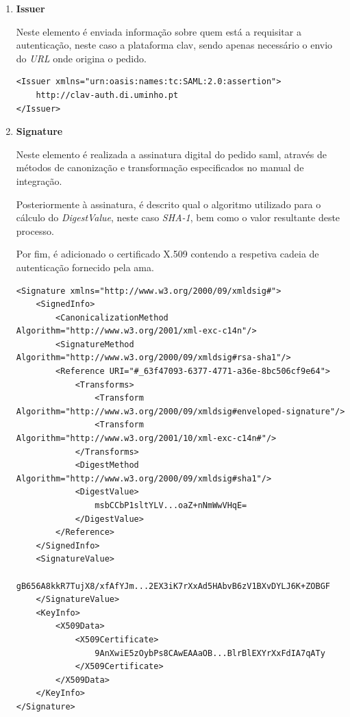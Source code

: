 \vspace{-2mm}
\begin{enumerate}
    \item \textbf{Issuer}
    
    Neste elemento é enviada informação sobre quem está a requisitar a autenticação, neste caso a plataforma \gls{clav}, sendo apenas necessário o envio do \emph{URL} onde origina o pedido\cite{manualAuthGov}.
    
    \begin{lstlisting}
<Issuer xmlns="urn:oasis:names:tc:SAML:2.0:assertion">
    http://clav-auth.di.uminho.pt
</Issuer>
    \end{lstlisting}
    
    \vspace{-14mm}
    \item \textbf{Signature}
    
    Neste elemento é realizada a assinatura digital do pedido \gls{saml}, através de métodos de canonização e transformação especificados no manual de integração\cite{manualAuthGov}.
    
    Posteriormente à assinatura, é descrito qual o algoritmo utilizado para o cálculo do \emph{DigestValue}, neste caso \emph{SHA-1}, bem como o valor resultante deste processo.
    
    Por fim, é adicionado o certificado X.509 contendo a respetiva cadeia de autenticação fornecido pela \gls{ama}.
    
    \begin{lstlisting}
<Signature xmlns="http://www.w3.org/2000/09/xmldsig#">
    <SignedInfo>
        <CanonicalizationMethod Algorithm="http://www.w3.org/2001/xml-exc-c14n"/>
        <SignatureMethod Algorithm="http://www.w3.org/2000/09/xmldsig#rsa-sha1"/>
        <Reference URI="#_63f47093-6377-4771-a36e-8bc506cf9e64">
            <Transforms>
                <Transform Algorithm="http://www.w3.org/2000/09/xmldsig#enveloped-signature"/>
                <Transform Algorithm="http://www.w3.org/2001/10/xml-exc-c14n#"/>
            </Transforms>
            <DigestMethod Algorithm="http://www.w3.org/2000/09/xmldsig#sha1"/>
            <DigestValue>
                msbCCbP1sltYLV...oaZ+nNmWwVHqE=
            </DigestValue>
        </Reference>
    </SignedInfo>
    <SignatureValue>
            gB656A8kkR7TujX8/xfAfYJm...2EX3iK7rXxAd5HAbvB6zV1BXvDYLJ6K+ZOBGF
    </SignatureValue>
    <KeyInfo>
        <X509Data>
            <X509Certificate>
                9AnXwiE5zOybPs8CAwEAAaOB...BlrBlEXYrXxFdIA7qATy
            </X509Certificate>
        </X509Data>
    </KeyInfo>
</Signature>
    \end{lstlisting}
    

\end{enumerate}
